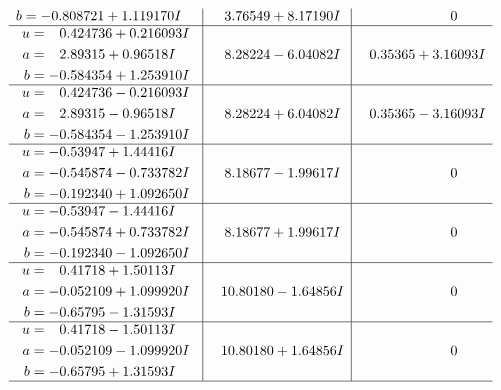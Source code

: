 \documentclass[1p]{elsarticle_modified}
\theoremstyle{definition}
\begin{document}
$$\begin{array}{c|c|c}
\begin{aligned}
b &= -0.808721 + 1.119170 I\end{aligned}
 & \phantom{-}3.76549 + 8.17190 I & \phantom{-0.000000 } 0 \\ \hline\begin{aligned}
u &= \phantom{-}0.424736 + 0.216093 I \\
a &= \phantom{-}2.89315 + 0.96518 I \\
b &= -0.584354 + 1.253910 I\end{aligned}
 & \phantom{-}8.28224 - 6.04082 I & \phantom{-}0.35365 + 3.16093 I \\ \hline\begin{aligned}
u &= \phantom{-}0.424736 - 0.216093 I \\
a &= \phantom{-}2.89315 - 0.96518 I \\
b &= -0.584354 - 1.253910 I\end{aligned}
 & \phantom{-}8.28224 + 6.04082 I & \phantom{-}0.35365 - 3.16093 I \\ \hline\begin{aligned}
u &= -0.53947 + 1.44416 I \\
a &= -0.545874 - 0.733782 I \\
b &= -0.192340 + 1.092650 I\end{aligned}
 & \phantom{-}8.18677 - 1.99617 I & \phantom{-0.000000 } 0 \\ \hline\begin{aligned}
u &= -0.53947 - 1.44416 I \\
a &= -0.545874 + 0.733782 I \\
b &= -0.192340 - 1.092650 I\end{aligned}
 & \phantom{-}8.18677 + 1.99617 I & \phantom{-0.000000 } 0 \\ \hline\begin{aligned}
u &= \phantom{-}0.41718 + 1.50113 I \\
a &= -0.052109 + 1.099920 I \\
b &= -0.65795 - 1.31593 I\end{aligned}
 & \phantom{-}10.80180 - 1.64856 I & \phantom{-0.000000 } 0 \\ \hline\begin{aligned}
u &= \phantom{-}0.41718 - 1.50113 I \\
a &= -0.052109 - 1.099920 I \\
b &= -0.65795 + 1.31593 I\end{aligned}
 & \phantom{-}10.80180 + 1.64856 I & \phantom{-0.000000 } 0\\
 \hline 
 \end{array}$$\newpage$$\begin{array}{c|c|c}  

\end{array}$$
\end{document}
